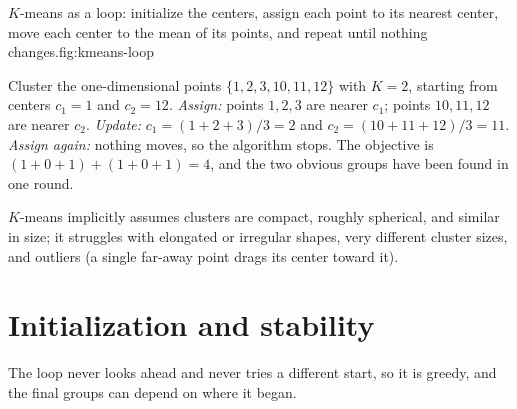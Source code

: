 \begin{utpfig}{$K$-means as a loop: initialize the centers, assign each point to its nearest center, move each center to the mean of its points, and repeat until nothing changes.}{fig:kmeans-loop}
\end{utpfig}

\begin{workedexample}
Cluster the one-dimensional points $\{1,2,3,10,11,12\}$ with $K=2$, starting from centers $c_1=1$ and $c_2=12$.
\emph{Assign:} points $1,2,3$ are nearer $c_1$; points $10,11,12$ are nearer $c_2$.
\emph{Update:} $c_1=(1+2+3)/3=2$ and $c_2=(10+11+12)/3=11$.
\emph{Assign again:} nothing moves, so the algorithm stops. The objective is $(1+0+1)+(1+0+1)=4$, and the two obvious groups have been found in one round.
\end{workedexample}

$K$-means implicitly assumes clusters are compact, roughly spherical, and similar in size; it struggles with elongated or irregular shapes, very different cluster sizes, and outliers (a single far-away point drags its center toward it).

\section{Initialization and stability}

The loop never looks ahead and never tries a different start, so it is greedy, and the final groups can depend on where it began.

